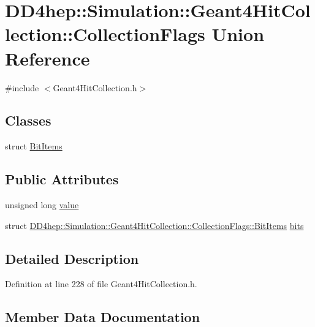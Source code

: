 \hypertarget{union_d_d4hep_1_1_simulation_1_1_geant4_hit_collection_1_1_collection_flags}{}\section{D\+D4hep\+:\+:Simulation\+:\+:Geant4\+Hit\+Collection\+:\+:Collection\+Flags Union Reference}
\label{union_d_d4hep_1_1_simulation_1_1_geant4_hit_collection_1_1_collection_flags}


{\ttfamily \#include $<$Geant4\+Hit\+Collection.\+h$>$}

\subsection*{Classes}
\begin{DoxyCompactItemize}
\item 
struct \hyperlink{struct_d_d4hep_1_1_simulation_1_1_geant4_hit_collection_1_1_collection_flags_1_1_bit_items}{Bit\+Items}
\end{DoxyCompactItemize}
\subsection*{Public Attributes}
\begin{DoxyCompactItemize}
\item 
unsigned long \hyperlink{union_d_d4hep_1_1_simulation_1_1_geant4_hit_collection_1_1_collection_flags_a41662e93df084e0be2823219e1b09934}{value}
\item 
struct \hyperlink{struct_d_d4hep_1_1_simulation_1_1_geant4_hit_collection_1_1_collection_flags_1_1_bit_items}{D\+D4hep\+::\+Simulation\+::\+Geant4\+Hit\+Collection\+::\+Collection\+Flags\+::\+Bit\+Items} \hyperlink{union_d_d4hep_1_1_simulation_1_1_geant4_hit_collection_1_1_collection_flags_af42792808f44426300dfd74c4dac5d89}{bits}
\end{DoxyCompactItemize}


\subsection{Detailed Description}


Definition at line 228 of file Geant4\+Hit\+Collection.\+h.



\subsection{Member Data Documentation}
\hypertarget{union_d_d4hep_1_1_simulation_1_1_geant4_hit_collection_1_1_collection_flags_af42792808f44426300dfd74c4dac5d89}{}\label{union_d_d4hep_1_1_simulation_1_1_geant4_hit_collection_1_1_collection_flags_af42792808f44426300dfd74c4dac5d89} 
